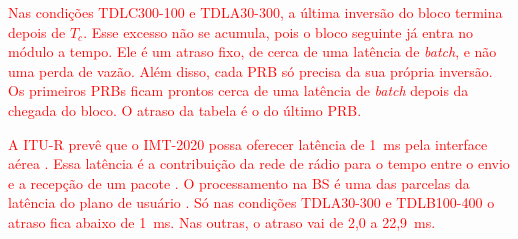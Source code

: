 \textcolor{red}{Nas condições TDLC300-100 e TDLA30-300, a última inversão do bloco termina depois de $T_c$. Esse excesso não se acumula, pois o bloco seguinte já entra no módulo a tempo. Ele é um atraso fixo, de cerca de uma latência de \textit{batch}, e não uma perda de vazão. Além disso, cada PRB só precisa da sua própria inversão. Os primeiros PRBs ficam prontos cerca de uma latência de \textit{batch} depois da chegada do bloco. O atraso da tabela é o do último PRB.}

\textcolor{red}{A ITU-R prevê que o IMT-2020 possa oferecer latência de 1~ms pela interface aérea \cite[p.~14]{itu-m2083}. Essa latência é a contribuição da rede de rádio para o tempo entre o envio e a recepção de um pacote \cite[p.~13]{itu-m2083}. O processamento na BS é uma das parcelas da latência do plano de usuário \cite[Sec.~7.2.6 e Tab.~3]{itu-m2412}. Só nas condições TDLA30-300 e TDLB100-400 o atraso fica abaixo de 1~ms. Nas outras, o atraso vai de 2,0 a 22,9~ms.}

